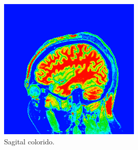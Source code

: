 \documentclass{article}
\begin{document}
\begin{figure}[h]
\begin{subfigure}[b]{0.3\textwidth}
        \includegraphics[width=\textwidth]{brain/radiologist-sagital.png}
        \caption{Sagital colorido.}
    \end{subfigure}
    ~
    \begin{subfigure}[b]{0.3\textwidth}

\end{subfigure}
\end{figure}
\end{document}

